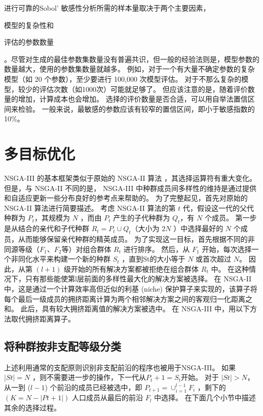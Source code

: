 进行可靠的Sobol' 敏感性分析所需的样本量取决于两个主要因素，\begin{enumerate*}
    \item 模型的复杂性和
    \item 评估的参数数量
\end{enumerate*} 。尽管对生成的最佳参数集数量没有普遍共识，但一般的经验法则是，模型参数的数量越大，使用的参数集数量就越多。%
例如，对于一个有大量不确定参数的复杂模型（如 20 个参数），至少要进行 100,000 次模型评估。%
对于不那么复杂的模型，较少的评估次数（如1000次）可能就足够了。%
但应该注意的是，随着评价数量的增加，计算成本也会增加。%
选择的评价数量是否合适，可以用自举法置信区间来检验。%
一般来说，最敏感的参数应该有较窄的置信区间，即小于敏感指数的10\%。

\section{多目标优化}
NSGA-III 的基本框架类似于原始的 NSGA-II 算法 \cite{NSGA2}，其选择运算符有重大变化。
但是，与 NSGA-II 不同的是， NSGA-III 中种群成员间多样性的维持是通过提供和自适应更新一些分布良好的参考点来帮助的。
为了完整起见，首先对原始的 NSGA-II 算法进行简要描述。
考虑 NSGA-II 算法的第 $t$ 代，假设这一代的父代种群为 $P_t$，其规模为 $N$ ，而由 $P_t$ 产生的子代种群为 $Q_t$，有 $N$ 个成员。
第一步是从结合的亲代和子代种群 $R_t = P_t \cup Q_t$（大小为 $2N$ ）中选择最好的 $N$ 个成员，从而能够保留亲代种群的精英成员。
为了实现这一目标，首先根据不同的非同源等级（$F_1$、$F_2$等）对组合群体 $R_t$ 进行排序。
然后，从 $F_1$ 开始，每次选择一个非同化水平来构建一个新的种群 $S_t$ ，直到St的大小等于 $N$ 或首次超过 $N$。
因此，从第 $(l+1)$ 级开始的所有解决方案都被拒绝在组合群体 $R_t$ 中。
在这种情况下，只有那些能使第l层前面的多样性最大化的解决方案被选择。
在 NSGA-II 中，这是通过一个计算效率高但近似的利基 (niche) 保护算子来实现的，该算子将每个最后一级成员的拥挤距离计算为两个相邻解决方案之间的客观归一化距离之和。
此后，具有较大拥挤距离值的解决方案被选中。
在 NSGA-III 中，用以下方法取代拥挤距离算子。

\subsection{将种群按非支配等级分类}

上述利用通常的支配原则\cite{chankong1983}识别非支配前沿的程序也被用于NSGA-III。
如果 $|St|=N$ ，则不需要进一步的操作，下一代从$P_t+1=S_t$开始。
对于 $|St|>N$，从一到 ($l-1$) 个前沿的成员已经被选中，即 $P_{t+1}= \cup_{i=1}^{l-1} F_i$ ，剩下的 $(K=N-|Pt+1|)$ 人口成员从最后的前沿 $F_l$ 中选择。
在下面几个小节中描述其余的选择过程。

